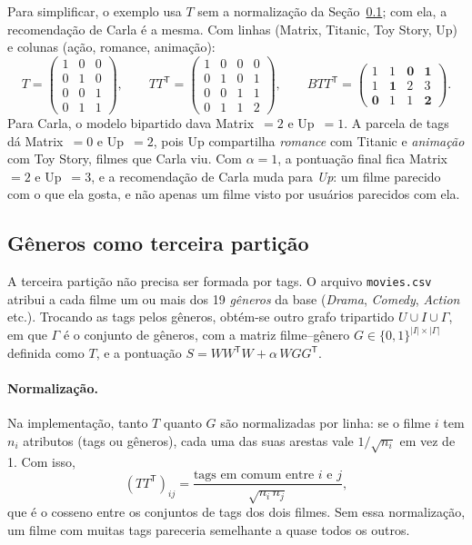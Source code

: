 \documentclass[12pt,a4paper]{article}
\theoremstyle{definition}
\begin{document}
Para simplificar, o exemplo usa $T$ sem a normalização da Seção~\ref{sec:generos}; com ela, a recomendação de Carla é a mesma. Com linhas (Matrix, Titanic, Toy Story, Up) e colunas (ação, romance, animação):
\[
  T = \begin{pmatrix}
    1 & 0 & 0\\
    0 & 1 & 0\\
    0 & 0 & 1\\
    0 & 1 & 1
  \end{pmatrix},
  \qquad
  TT^{\mathsf T} = \begin{pmatrix}
    1 & 0 & 0 & 0\\
    0 & 1 & 0 & 1\\
    0 & 0 & 1 & 1\\
    0 & 1 & 1 & 2
  \end{pmatrix},
  \qquad
  BTT^{\mathsf T} = \begin{pmatrix}
    1 & 1 & \mathbf{0} & \mathbf{1}\\
    1 & \mathbf{1} & 2 & 3\\
    \mathbf{0} & 1 & 1 & \mathbf{2}
  \end{pmatrix}.
\]
Para Carla, o modelo bipartido dava \mbox{Matrix $= 2$} e \mbox{Up $= 1$}. A parcela de
tags dá \mbox{Matrix $= 0$} e \mbox{Up $= 2$}, pois Up compartilha \emph{romance} com
Titanic e \emph{animação} com Toy Story, filmes que Carla viu. Com
$\alpha = 1$, a pontuação final fica \mbox{Matrix $= 2$} e \mbox{Up $= 3$}, e a
recomendação de Carla muda para \emph{Up}: um filme parecido com o que ela
gosta, e não apenas um filme visto por usuários parecidos com ela.

\subsection{Gêneros como terceira partição}\label{sec:generos}

A terceira partição não precisa ser formada por tags. O arquivo
\texttt{movies.csv} atribui a cada filme um ou mais dos 19 \emph{gêneros}
da base (\emph{Drama}, \emph{Comedy}, \emph{Action} etc.). Trocando as tags
pelos gêneros, obtém-se outro grafo tripartido $U \cup I \cup \Gamma$, em
que $\Gamma$ é o conjunto de gêneros, com a matriz filme--gênero
$G \in \{0,1\}^{|I| \times |\Gamma|}$ definida como $T$, e
a pontuação $S = WW^{\mathsf T}W + \alpha\, WGG^{\mathsf T}$.

\paragraph{Normalização.}
Na implementação, tanto $T$ quanto $G$ são normalizadas por linha: se o
filme $i$ tem $n_i$ atributos (tags ou gêneros), cada uma das suas arestas vale $1/\sqrt{n_i}$
em vez de 1. Com isso,
\[
  (TT^{\mathsf T})_{ij} = \frac{\text{tags em comum entre } i \text{ e } j}{\sqrt{n_i\, n_j}},
\]
que é o cosseno entre os conjuntos de tags dos dois filmes. Sem essa
normalização, um filme com muitas tags pareceria semelhante a quase
todos os outros.
\end{document}

